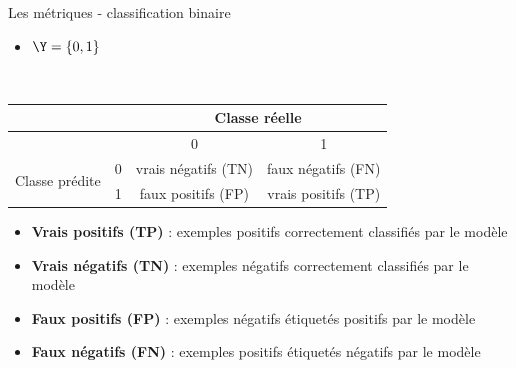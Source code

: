 \documentclass[10pt]{beamer}
\begin{document}





\begin{frame}{Les métriques - classification binaire}
	\vspace*{-1.8em}
	\begin{itemize}
		\item $\Y = \{0,1\}$\\[1em]
	\end{itemize}
	
	
	\begin{center}
		 \\[1em]
		\begin{table}[h!]
			\centering
			\begin{tabular}{|c|c|c|c|}
				\hline
				\multicolumn{2}{|c|}{} & \multicolumn{2}{c|}{Classe réelle} \\ \hline
				\multicolumn{2}{|c|}{} & 0 & 1 \\ \hline
				\multirow{2}{*}{Classe prédite} & 0 & vrais négatifs (TN) & faux négatifs (FN) \\ \cline{2-4} 
				& 1 & faux positifs (FP) & vrais positifs (TP) \\ \hline
			\end{tabular}
		\end{table}
	\end{center}
	\vspace{0.5em}
	\begin{itemize}
		\item \textbf{Vrais positifs (TP)} : exemples positifs correctement classifiés par le modèle\\[0.3em]
		\item \textbf{Vrais négatifs (TN)} : exemples négatifs correctement classifiés par le modèle\\[0.3em]
		\item \textbf{Faux positifs (FP)} : exemples négatifs étiquetés positifs par le modèle\\[0.3em]
		\item \textbf{Faux négatifs (FN)} : exemples positifs étiquetés négatifs par le modèle\\[0.3em]
	\end{itemize}
	\vspace*{2em}
	
\end{frame}
\end{document}

